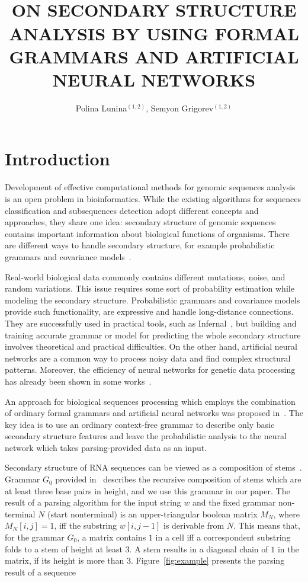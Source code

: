 \documentclass[12pt,a4paper]{cibb}
\title{\large $\ $\\ \bf ON SECONDARY STRUCTURE ANALYSIS BY USING FORMAL GRAMMARS AND ARTIFICIAL NEURAL NETWORKS}
\author{ Polina Lunina$^{(1,2)}$, Semyon Grigorev$^{(1,2)}$}
\begin{document}
\thispagestyle{myheadings}
\pagestyle{myheadings}



\section{\bf Introduction}

Development of effective computational methods for genomic sequences analysis is an open problem in bioinformatics.
While the existing algorithms for sequences classification and subsequences detection adopt different concepts and approaches, they share one idea: secondary structure of genomic sequences contains important information about biological functions of organisms.
There are different ways to handle secondary structure, for example probabilistic grammars and covariance models~\cite{EddyDurbin, dowell2004evaluation, knudsen1999rna}.

Real-world biological data commonly contains different mutations, noise, and random variations.
This issue requires some sort of probability estimation while modeling the secondary structure.
Probabilistic grammars and covariance models provide such functionality, are expressive and handle long-distance connections.
They are successfully used in practical tools, such as Infernal~\cite{Infernal}, but building and training accurate grammar or model for predicting the whole secondary structure involves theoretical and practical difficulties.
On the other hand, artificial neural networks are a common way to process noisy data and find complex structural patterns.
Moreover, the efficiency of neural networks for genetic data processing has already been shown in some works~\cite{Humidor,ANN}.

An approach for biological sequences processing which employs the combination of ordinary formal grammars and artificial neural networks was proposed in~\cite{grigorevcomposition}.
The key idea is to use an ordinary context-free grammar to describe only basic secondary structure features and leave the probabilistic analysis to the neural network which takes parsing-provided data as an input.

Secondary structure of RNA sequences can be viewed as a composition of stems~\cite{MQbioinformatics19}.
Grammar $G_0$ provided in~\cite{grigorevcomposition} describes the recursive composition of stems which are at least three base pairs in height, and we use this grammar in our paper.
The result of a parsing algorithm for the input string $w$ and the fixed grammar non-terminal $N$ (start nonterminal) is an upper-triangular boolean matrix $M_N$, where $M_N [i,j] = 1$, iff the substring $w[i,j-1]$ is derivable from $N$.
This means that, for the grammar $G_0$, a matrix contains $1$ in a cell iff a correspondent substring folds to a  stem of height at least 3.
A stem results in a diagonal chain of $1$ in the matrix, if its height is more than 3.
Figure~\ref{fig:example} presents the parsing result of a sequence
\end{document}
